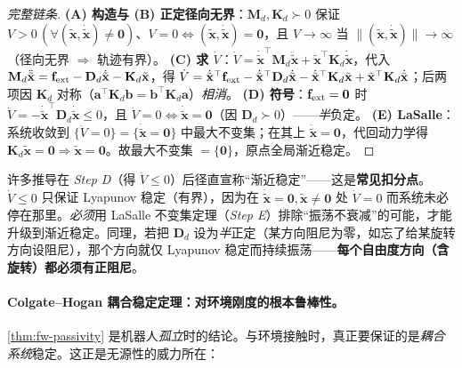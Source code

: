 \begin{proof}[完整链条]
\textbf{(A) 构造与 (B) 正定径向无界}：$\mathbf{M}_d,\mathbf{K}_d\succ0$ 保证 $V>0\,(\forall(\tilde{\mathbf{x}},\dot{\tilde{\mathbf{x}}})\neq\mathbf{0})$、$V=0\!\iff\!(\tilde{\mathbf{x}},\dot{\tilde{\mathbf{x}}})=\mathbf{0}$，且 $V\!\to\!\infty$ 当 $\|(\tilde{\mathbf{x}},\dot{\tilde{\mathbf{x}}})\|\!\to\!\infty$（径向无界 $\Rightarrow$ 轨迹有界）。
\textbf{(C) 求 $\dot V$}：$\dot V=\dot{\tilde{\mathbf{x}}}^\top\mathbf{M}_d\ddot{\tilde{\mathbf{x}}}+\tilde{\mathbf{x}}^\top\mathbf{K}_d\dot{\tilde{\mathbf{x}}}$，代入 $\mathbf{M}_d\ddot{\tilde{\mathbf{x}}}=\mathbf{f}_{\rm ext}-\mathbf{D}_d\dot{\tilde{\mathbf{x}}}-\mathbf{K}_d\tilde{\mathbf{x}}$，得 $\dot V=\dot{\tilde{\mathbf{x}}}^\top\mathbf{f}_{\rm ext}-\dot{\tilde{\mathbf{x}}}^\top\mathbf{D}_d\dot{\tilde{\mathbf{x}}}-\dot{\tilde{\mathbf{x}}}^\top\mathbf{K}_d\tilde{\mathbf{x}}+\tilde{\mathbf{x}}^\top\mathbf{K}_d\dot{\tilde{\mathbf{x}}}$；后两项因 $\mathbf{K}_d$ 对称（$\mathbf{a}^\top\mathbf{K}_d\mathbf{b}=\mathbf{b}^\top\mathbf{K}_d\mathbf{a}$）\emph{相消}。
\textbf{(D) 符号}：$\mathbf{f}_{\rm ext}=\mathbf{0}$ 时 $\dot V=-\dot{\tilde{\mathbf{x}}}^\top\mathbf{D}_d\dot{\tilde{\mathbf{x}}}\le0$，且 $\dot V=0\!\iff\!\dot{\tilde{\mathbf{x}}}=\mathbf{0}$（因 $\mathbf{D}_d\succ0$）——\emph{半}负定。
\textbf{(E) LaSalle}：系统收敛到 $\{\dot V=0\}=\{\dot{\tilde{\mathbf{x}}}=\mathbf{0}\}$ 中最大不变集；在其上 $\ddot{\tilde{\mathbf{x}}}=\mathbf{0}$，代回动力学得 $\mathbf{K}_d\tilde{\mathbf{x}}=\mathbf{0}\Rightarrow\tilde{\mathbf{x}}=\mathbf{0}$。故最大不变集 $=\{\mathbf{0}\}$，原点全局渐近稳定。
\end{proof}

\begin{insight}
\label{ins:fw-lasalle}
许多推导在 \emph{Step D}（得 $\dot V\le0$）后径直宣称“渐近稳定”——这是\textbf{常见扣分点}。$\dot V\le0$ 只保证 Lyapunov 稳定（有界），因为在 $\dot{\tilde{\mathbf{x}}}=\mathbf{0},\tilde{\mathbf{x}}\neq\mathbf{0}$ 处 $\dot V=0$ 而系统未必停在那里。\emph{必须}用 LaSalle 不变集定理（\emph{Step E}）排除“振荡不衰减”的可能，才能升级到渐近稳定。同理，若把 $\mathbf{D}_d$ 设为\emph{半}正定（某方向阻尼为零，如忘了给某旋转方向设阻尼），那个方向就仅 Lyapunov 稳定而持续振荡——\textbf{每个自由度方向（含旋转）都必须有正阻尼}。
\end{insight}

\paragraph{Colgate--Hogan 耦合稳定定理：对环境刚度的根本鲁棒性。}
\cref{thm:fw-passivity} 是机器人\emph{孤立}时的结论。与环境接触时，真正要保证的是\emph{耦合系统}稳定。这正是无源性的威力所在：

